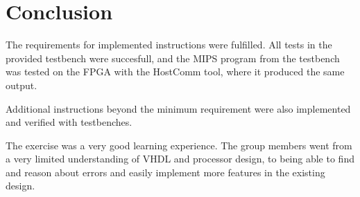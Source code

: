 \chapter{Conclusion}
The requirements for implemented instructions were fulfilled.
All tests in the provided testbench were succesfull,
and the MIPS program from the testbench was tested on the FPGA with the HostComm tool,
where it produced the same output.

Additional instructions beyond the minimum requirement were also implemented and verified with testbenches.

The exercise was a very good learning experience.
The group members went from a very limited understanding of VHDL and processor design,
to being able to find and reason about errors and easily implement more features in the existing design.

